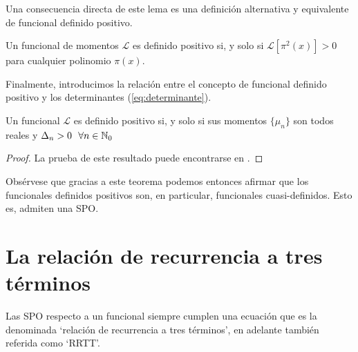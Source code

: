 Una consecuencia directa de este lema es una definición alternativa y equivalente de funcional definido positivo.

\begin{corolario}
    Un funcional de momentos $\mathcal{L}$ es definido positivo si, y solo si $\mathcal{L}[\pi^2(x)]>0$ para cualquier polinomio $\pi(x)$.
\end{corolario}

Finalmente, introducimos la relación entre el concepto de funcional definido positivo y los determinantes (\ref{eq:determinante}).

\begin{teorema}
    Un funcional $\mathcal{L}$ es definido positivo si, y solo si sus momentos $\{\mu_n\}$ son todos reales y $\Delta_n>0 \ \ \forall n\in\mathbb{N}_0$
\end{teorema}
\begin{proof}
    La prueba de este resultado puede encontrarse en \cite[Teorema 3.4]{chihara}.
\end{proof}

Obsérvese que gracias a este teorema podemos entonces afirmar que los funcionales definidos positivos son, en particular, funcionales cuasi-definidos. Esto es, admiten una SPO.

\section{La relación de recurrencia a tres términos}
\label{section:RRTT}

Las SPO respecto a un funcional siempre cumplen una ecuación que es la denominada `relación de recurrencia a tres términos', en adelante también referida como `RRTT'.


